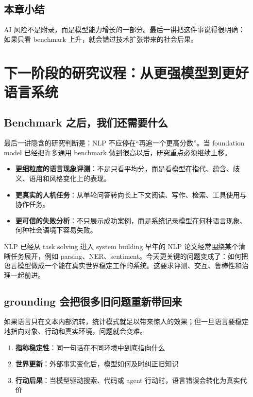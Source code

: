 \documentclass[a4paper]{article}
\begin{document}
\subsection{本章小结}

AI 风险不是附录，而是模型能力增长的一部分。最后一讲把这件事说得很明确：如果只看 benchmark 上升，就会错过技术扩张带来的社会后果。


\section{下一阶段的研究议程：从更强模型到更好语言系统}

\subsection{Benchmark 之后，我们还需要什么}

最后一讲隐含的研究判断是：NLP 不应停在``再追一个更高分数''。当 foundation model 已经把许多通用 benchmark 做到很高以后，研究重点必须继续上移。

\begin{itemize}
    \item \textbf{更细粒度的语言现象评测}：不是只看平均分，而是看模型在指代、蕴含、歧义、语用和风格变化上的表现。
    \item \textbf{更真实的人机任务}：从单轮问答转向长上下文阅读、写作、检索、工具使用与协作任务。
    \item \textbf{更可信的失败分析}：不只展示成功案例，而是系统记录模型在何种语言现象、何种社会语境下容易失败。
\end{itemize}

\begin{importantbox}{NLP 已经从 task solving 进入 system building}
早年的 NLP 论文经常围绕某个清晰任务展开，例如 parsing、NER、sentiment。今天更关键的问题变成了：如何把语言模型做成一个能在真实世界稳定工作的系统。这要求评测、交互、鲁棒性和治理一起前进。
\end{importantbox}

\subsection{grounding 会把很多旧问题重新带回来}

如果语言只在文本内部流转，统计模式就足以带来惊人的效果；但一旦语言要稳定地指向对象、行动和真实环境，问题就会变难。

\begin{enumerate}
    \item \textbf{指称稳定性}：同一句话在不同环境中到底指向什么
    \item \textbf{世界更新}：外部事实变化后，模型如何及时纠正旧知识
    \item \textbf{行动后果}：当模型驱动搜索、代码或 agent 行动时，语言错误会转化为真实代价
\end{enumerate}
\end{document}
